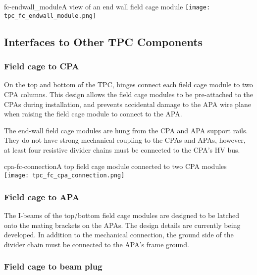 \begin{cdrfigure}{fc-endwall_module}{A view of an end wall field cage module}
\texttt{[image: tpc\_fc\_endwall\_module.png]}
\end{cdrfigure}


\subsection{Interfaces to Other TPC Components}

\subsubsection{Field cage to CPA}

On the top and bottom of the TPC, hinges connect each field cage module to two CPA columns.  This design allows the field cage modules to be pre-attached to the CPAs during installation, and prevents accidental damage to the APA wire plane when raising the field cage module to connect %
to the APA.

The end-wall field cage modules are hung from the CPA and APA support rails.  They do not have strong mechanical coupling to the CPAs and APAs, however, at least four resistive divider chains must be connected to the CPA's HV bus.

\begin{cdrfigure}{cpa-fc-connection}{A top field cage module connected to two CPA modules}
\texttt{[image: tpc\_fc\_cpa\_connection.png]}
\end{cdrfigure}


\subsubsection{Field cage to APA}

The I-beams of the top/bottom field cage modules are designed to be latched onto the mating brackets on the APAs.  The design details are currently being developed. %
In addition to the mechanical connection, the ground side of the divider chain must be connected to the APA's frame ground. %


\subsubsection{Field cage to beam plug}

